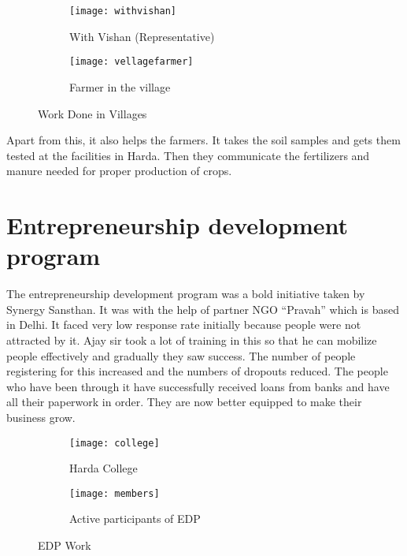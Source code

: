 \begin{figure}[ht!]
	\begin{subfigure}{.5\textwidth}
	  	\centering
	  	\texttt{[image: withvishan]}
	  	\caption{With Vishan (Representative)}
	  	\label{fig:sub1}
	\end{subfigure}%
	\begin{subfigure}{.5\textwidth}
	  	\centering
	  	\texttt{[image: vellagefarmer]}
	  	\caption{Farmer in the village}
	  	\label{fig:sub2}
	\end{subfigure}
	\caption{Work Done in Villages}
	\label{figstart}
\end{figure}


Apart from this, it also helps the farmers. It takes the soil samples and gets them tested at the facilities in Harda. Then they communicate the fertilizers and manure needed for proper production of crops.

\section{Entrepreneurship development program}
The entrepreneurship development program was a bold initiative taken by Synergy Sansthan. It was with the help of partner NGO ``Pravah'' which is based in Delhi. It faced very low response rate initially because people were not attracted by it. Ajay sir took a lot of training in this so that he can mobilize people effectively and gradually they saw success. The number of people registering for this increased and the numbers of dropouts reduced. The people who have been through it have successfully received loans from banks and have all their paperwork in order. They are now better equipped to make their business grow. 
\begin{figure}[ht!]
	\begin{subfigure}{.5\textwidth}
	  	\centering
	  	\texttt{[image: college]}
	  	\caption{Harda College}
	  	\label{fig:sub1}
	\end{subfigure}%
	\begin{subfigure}{.5\textwidth}
	  	\centering
	  	\texttt{[image: members]}
	  	\caption{Active participants of EDP}
	  	\label{fig:sub2}
	\end{subfigure}
	\caption{EDP Work}
	\label{figstart}
\end{figure}





